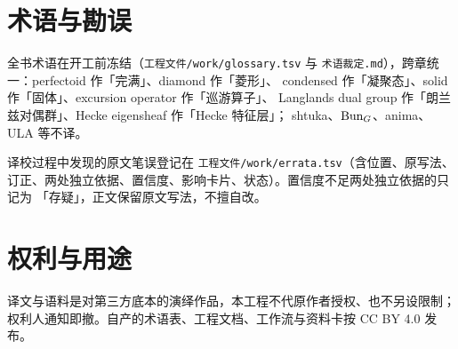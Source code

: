 \section*{术语与勘误}
全书术语在开工前冻结（\texttt{工程文件/work/glossary.tsv} 与
\texttt{术语裁定.md}），跨章统一：perfectoid 作「完满」、diamond 作「菱形」、
condensed 作「凝聚态」、solid 作「固体」、excursion operator 作「巡游算子」、
Langlands dual group 作「朗兰兹对偶群」、Hecke eigensheaf 作「Hecke 特征层」；
shtuka、$\mathrm{Bun}_G$、anima、ULA 等不译。

译校过程中发现的原文笔误登记在 \texttt{工程文件/work/errata.tsv}（含位置、原写法、
订正、两处独立依据、置信度、影响卡片、状态）。置信度不足两处独立依据的只记为
「存疑」，正文保留原文写法，不擅自改。

\section*{权利与用途}
译文与语料是对第三方底本的演绎作品，本工程不代原作者授权、也不另设限制；
权利人通知即撤。自产的术语表、工程文档、工作流与资料卡按 CC BY 4.0 发布。
